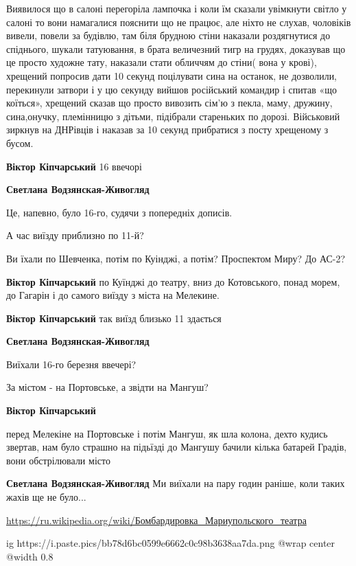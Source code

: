 \begin{itemize}
Виявилося що в салоні перегоріла лампочка і коли їм сказали увімкнути світло у
салоні то вони намагалися пояснити що не працює, але ніхто не слухав, чоловіків
вивели, повели за будівлю, там біля брудною стіни наказали роздягнутися до
спіднього, шукали татуювання, в брата величезний тигр на грудях, доказував що
це просто художне тату, наказали стати обличчям до стіни( вона у крові),
хрещений попросив дати 10 секунд поцілувати сина на останок, не дозволили,
перекинули затвори і у цю секунду вийшов російський командир і спитав «що
коїться», хрещений сказав що просто вивозить сім'ю з пекла, маму, дружину,
сина,онучку, племінницю з дітьми, підібрали стареньких по дорозі. Військовий
зиркнув на ДНРівців і наказав за 10 секунд прибратися з посту хрещеному з
бусом.

\textbf{Віктор Кіпчарський} 16 ввечорі

\textbf{Светлана Водзянская-Живогляд} 

Це, напевно, було 16-го, судячи з попередніх дописів.

А час виїзду приблизно по 11-й?

Ви їхали по Шевченка, потім по Куінджі, а потім? Проспектом Миру? До АС-2?

\textbf{Віктор Кіпчарський} по Куїнджі до театру, вниз до Котовського, понад морем, до Гагарін і до самого виїзду з міста на Мелекине.

\textbf{Віктор Кіпчарський} так виїзд близько 11 здається

\textbf{Светлана Водзянская-Живогляд}

Виїхали 16-го березня ввечері?

За містом - на Портовське, а звідти на Мангуш?

\textbf{Віктор Кіпчарський} 

перед Мелекіне на Портовське і потім Мангуш, як шла колона, дехто кудись
звертав, нам було страшно на підьїзді до Мангушу бачили кілька батарей Градів,
вони обстрілювали місто

\textbf{Светлана Водзянская-Живогляд} Ми виїхали на пару годин раніше, коли таких жахів ще не було...

\end{itemize} %

\begin{center}
\begin{minipage}{\textwidth}

\url{https://ru.wikipedia.org/wiki/Бомбардировка_Мариупольского_театра}

\ifcmt
  ig https://i.paste.pics/bb78d6bc0599e6662c0c98b3638aa7da.png
  @wrap center
  @width 0.8
\fi

\end{minipage}
\end{center}
